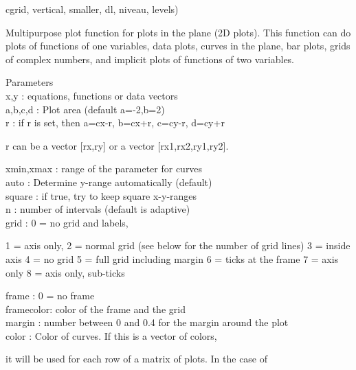 \documentclass{article}
\begin{document}
\begin{eulernotebook}
\begin{eulercomment}
\begin{eulercomment}
\begin{eulercomment}
\begin{eulercomment}
\begin{eulercomment}
\begin{eulercomment}
\begin{eulercomment}
\begin{eulercomment}
\begin{eulerttcomment}
  cgrid, vertical, smaller, dl, niveau, levels)
\end{eulerttcomment}
\begin{eulercomment}
Multipurpose plot function for plots in the plane (2D plots). This function can do
plots of functions of one variables, data plots, curves in the plane, bar plots, grids
of complex numbers, and implicit plots of functions of two variables.

Parameters
\\
x,y       : equations, functions or data vectors\\
a,b,c,d   : Plot area (default a=-2,b=2)\\
r         : if r is set, then a=cx-r, b=cx+r, c=cy-r, d=cy+r\\
\end{eulercomment}
\begin{eulerttcomment}
            r can be a vector [rx,ry] or a vector [rx1,rx2,ry1,ry2].
\end{eulerttcomment}
\begin{eulercomment}
xmin,xmax : range of the parameter for curves\\
auto      : Determine y-range automatically (default)\\
square    : if true, try to keep square x-y-ranges\\
n         : number of intervals (default is adaptive)\\
grid      : 0 = no grid and labels,\\
\end{eulercomment}
\begin{eulerttcomment}
            1 = axis only,
            2 = normal grid (see below for the number of grid lines)
            3 = inside axis
            4 = no grid
            5 = full grid including margin
            6 = ticks at the frame
            7 = axis only
            8 = axis only, sub-ticks
\end{eulerttcomment}
\begin{eulercomment}
frame     : 0 = no frame\\
framecolor: color of the frame and the grid\\
margin    : number between 0 and 0.4 for the margin around the plot\\
color     : Color of curves. If this is a vector of colors,\\
\end{eulercomment}
\begin{eulerttcomment}
            it will be used for each row of a matrix of plots. In the case of

\end{eulerttcomment}
\end{eulercomment}
\end{eulercomment}
\end{eulercomment}
\end{eulercomment}
\end{eulercomment}
\end{eulercomment}
\end{eulercomment}
\end{eulercomment}
\end{eulernotebook}
\end{document}
